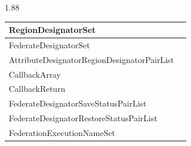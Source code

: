 {\begin{cxiitabletypeset}[7.70]{1.88}
{\begin{tabular}{|Y{220pt}|Y{300pt}|}
        RegionDesignatorSet &  \\ \hline
        FederateDesignatorSet &  \\ \hline
        AttributeDesignatorRegionDesignatorPairList &  \\ \hline
        CallbackArray &  \\ \hline
        CallbackReturn &  \\ \hline
        FederateDesignatorSaveStatusPairList &  \\ \hline
        FederateDesignatorRestoreStatusPairList &  \\ \hline
        FederationExecutionNameSet &  \\ \hline
        \end{tabular}%
    }
    \end{cxiitabletypeset}%
}

\newcommand{\cxiitabletwentysix}{%
    \cxiitabletitle{Table 26---WSDL standard time types}%
    \begin{cxiitabletypeset}[7.80]{1.45}
    \makebox[\linewidth][c]{%
        \begin{tabular}{|Y{118pt}|Y{154pt}|Y{154pt}|}
        \hline
        \Centering\arraybackslash\bfseries Property &
        \Centering\arraybackslash\bfseries 64-bit integer time\newline service name &
        \Centering\arraybackslash\bfseries 64-bit float time\newline service name \\
        \hline
        Symbolic name & HLAinteger64Time & HLAfloat64Time \\ \hline
        Encode time value & encodeHLAinteger64Time & encodeHLAfloat64Time \\ \hline
        Decode time value & decodeHLAinteger64Time & decodeHLAfloat64Time \\ \hline
        Encode interval value & encodeHLAinteger64Interval & encodeHLAfloat64Interval \\ \hline
        Decode interval value & decodeHLAinteger64Interval & decodeHLAfloat64Interval \\ \hline
        \end{tabular}%
    }
    \end{cxiitabletypeset}%
}

